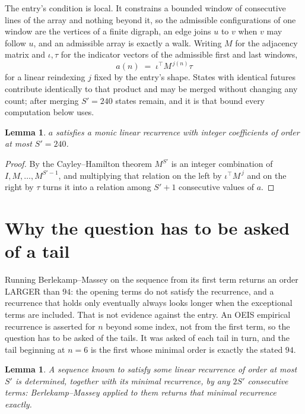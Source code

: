 \documentclass[11pt,a4paper]{article}
\theoremstyle{plain}
\newtheorem{lemma}[theorem]{Lemma}
\theoremstyle{definition}
\begin{document}
The entry's condition is local. It constrains a bounded window of consecutive lines of the
array and nothing beyond it, so the admissible configurations of one window are the vertices of
a finite digraph, an edge joins $u$ to $v$ when $v$ may follow $u$, and an admissible array is
exactly a walk. Writing $M$ for the adjacency matrix and $\iota,\tau$ for the indicator vectors
of the admissible first and last windows,
\[
a(n)\;=\;\iota^{\!\top}M^{\,j(n)}\tau
\]
for a linear reindexing $j$ fixed by the entry's shape. States with identical futures
contribute identically to that product and may be merged without changing any count; after
merging $S'=240$ states remain, and it is that bound every computation below uses.

\begin{lemma}\label{lem:cf}
$a$ satisfies a monic linear recurrence with integer coefficients of order at most $S'=240$.
\end{lemma}

\begin{proof}
By the Cayley--Hamilton theorem $M^{S'}$ is an integer combination of $I,M,\dots,M^{S'-1}$,
and multiplying that relation on the left by $\iota^{\!\top}M^{\,j}$ and on the right by
$\tau$ turns it into a relation among $S'+1$ consecutive values of $a$.
\end{proof}

\section{Why the question has to be asked of a tail}

Running Berlekamp--Massey on the sequence from its first term returns an order LARGER than $94$: the opening terms do not satisfy the recurrence, and a recurrence that holds only eventually always looks longer when the exceptional terms are included. That is not evidence against the entry. An OEIS empirical recurrence is asserted for $n$ beyond some index, not from the first term, so the question has to be asked of the tails. It was asked of each tail in turn, and the tail beginning at $n=6$ is the first whose minimal order is exactly the stated $94$.

\begin{lemma}\label{lem:bm}
A sequence known to satisfy some linear recurrence of order at most $S'$ is determined,
together with its minimal recurrence, by any $2S'$ consecutive terms: Berlekamp--Massey applied
to them returns that minimal recurrence exactly.
\end{lemma}
\end{document}
